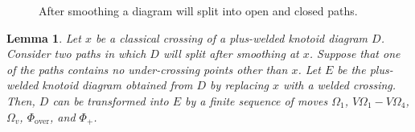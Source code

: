 \documentclass[11pt]{amsart}
\theoremstyle{noparens}
\newtheorem{lemma}{Lemma}[section]
\numberwithin{equation}{section}
\numberwithin{equation}{section}
\begin{document}
\begin{figure}[htbp]
\caption{After smoothing a diagram will split into open and closed paths.}
\label{Figure 13}
\end{figure}

\begin{lemma} \label{Lemma 3.2}	
Let $x$ be a classical crossing of a plus-welded knotoid diagram $D$. Consider two paths in which $D$ will split after smoothing at $x$. Suppose that one of the paths contains no under-crossing points other than $x$. Let $E$ be the plus-welded knotoid diagram obtained from $D$ by replacing $x$ with a welded crossing. Then, $D$ can be transformed into $E$ by a finite sequence of moves $\Omega_1$, $V\Omega_1 - V\Omega_4$, $\Omega_v$, $\Phi_{\text{over}}$, and $\Phi_+$. 
\end{lemma}
\end{document}
